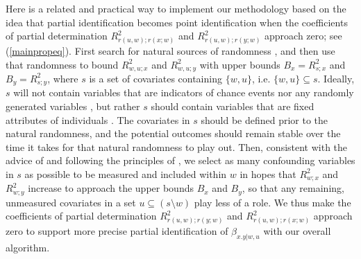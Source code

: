 \documentclass[11pt]{amsart}
\begin{document}
Here is a related and practical way to implement our methodology based on the idea that partial identification becomes point identification when the coefficients of partial determination $R^2_{r(u,w);r(x;w)}$ and $R^2_{r(u,w);r(y;w)}$ approach zero; see (\ref{mainpropeq}). First search for natural sources of randomness \citep{Rosen}, and then use that randomness to bound $R^2_{w,u;x}$ and $R^2_{w,u;y}$ with upper bounds $B_x=R^2_{s;x}$ and $B_y=R^2_{s;y}$, where $s$ is a set of covariates containing $\{w,u\}$, i.e. $\{w,u\}\subseteq s$. Ideally, $s$ will not contain variables that are indicators of chance events nor any randomly generated variables \citep{Pim}, but rather $s$ should contain variables that are fixed attributes of individuals \citep[Section 4.3]{Knaeble2024}. The covariates in $s$ should be defined prior to the natural randomness, and the potential outcomes should remain stable over the time it takes for that natural randomness to play out. Then, consistent with the advice of \citep{rubin2009} and following the principles of \citep{VandPrinc}, we select as many confounding variables in $s$ as possible to be measured and included within $w$ in hopes that $R^2_{w;x}$ and $R^2_{w;y}$ increase to approach the upper bounds $B_x$ and $B_y$, so that any remaining, unmeasured covariates in a set $u\subseteq (s\setminus w)$ play less of a role. %
We thus make the coefficients of partial determination $R^2_{r(u,w);r(y;w)}$ and $R^2_{r(u,w);r(x;w)}$ approach zero to support more precise partial identification of $\beta_{x.y|w,u}$ with our overall algorithm.
\end{document}
